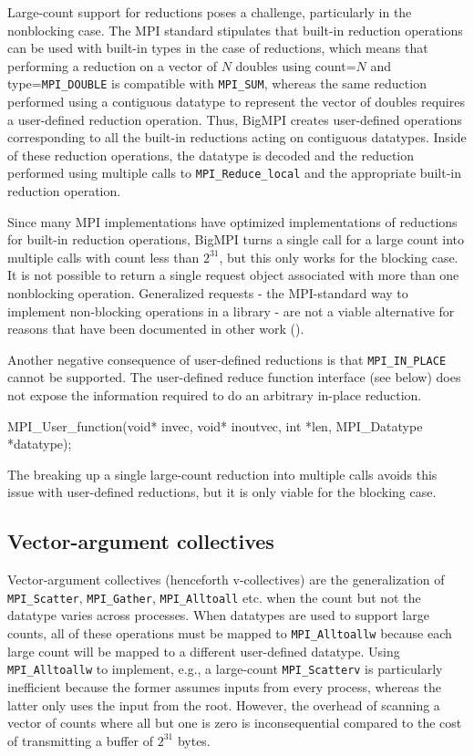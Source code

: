 Large-count support for reductions poses a challenge, particularly in the nonblocking case.
The MPI standard stipulates that built-in reduction operations can be used with built-in types
in the case of reductions, which means that performing a reduction on a vector of $N$
doubles using count=$N$ and type=\texttt{MPI\_DOUBLE} is compatible with \texttt{MPI\_SUM},
whereas the same reduction performed using a contiguous datatype to represent the vector
of doubles requires a user-defined reduction operation.
Thus, BigMPI creates user-defined operations corresponding to all the built-in reductions
acting on contiguous datatypes.  Inside of these reduction operations, the datatype is
decoded and the reduction performed using multiple calls to \texttt{MPI\_Reduce\_local}
and the appropriate built-in reduction operation.

Since many MPI implementations have optimized implementations of reductions for
built-in reduction operations, BigMPI turns a single call for a large count into multiple
calls with count less than $2^{31}$, but this only works for the blocking case.
It is not possible to return a single request object associated with more than one
nonblocking operation.  
Generalized requests - the MPI-standard way to implement non-blocking operations 
in a library - are not a viable alternative for reasons that have been documented 
in other work (\cite{latham:grequest-extensions}).

Another negative consequence of user-defined reductions is that  \texttt{MPI\_IN\_PLACE}
cannot be supported.  The user-defined reduce function interface (see below) does not expose
the information required to do an arbitrary in-place reduction.
\begin{code}
MPI_User_function(void* invec, void* inoutvec, 
                  int *len, MPI_Datatype *datatype);
\end{code}
The breaking up a single large-count reduction into multiple calls avoids this
issue with user-defined reductions, but it is only viable for the blocking case.

\subsection{Vector-argument collectives}

Vector-argument collectives (henceforth v-collectives) are the generalization of 
\texttt{MPI\_Scatter}, \texttt{MPI\_Gather}, \texttt{MPI\_Alltoall} etc.
when the count but not the datatype varies across processes.
When datatypes are used to support large counts, all of these operations must be
mapped to \texttt{MPI\_Alltoallw} because each large count will be mapped
to a different user-defined datatype.
Using \texttt{MPI\_Alltoallw} to implement, e.g., a large-count \texttt{MPI\_Scatterv} is
particularly inefficient because the former assumes inputs from every process,
whereas the latter only uses the input from the root.
However, the overhead of scanning a vector of counts where all but one is zero
is inconsequential compared to the cost of transmitting a buffer of $2^{31}$ bytes.

